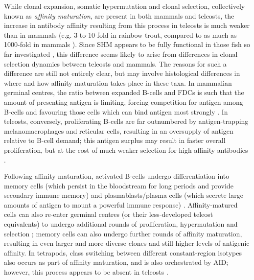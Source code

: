 While clonal expansion, somatic hypermutation and clonal selection, collectively known as \textit{affinity maturation}, are present in both mammals and teleosts, the increase in antibody affinity resulting from this process in teleosts is much weaker than in mammals (e.g. 3-to-10-fold in rainbow trout, compared to as much as 1000-fold in mammals \parencite{magor2015affinity}). Since SHM appears to be fully functional in those fish so far investigated \parencite{magor2015affinity}, this difference seems likely to arise from differences in clonal selection dynamics between teleosts and mammals. The reasons for such a difference are still not entirely clear, but may involve histological differences in where and how affinity maturation takes place in these taxa. In mammalian germinal centres, the ratio between expanded B-cells and FDCs is such that the amount of presenting antigen is limiting, forcing competition for antigen among B-cells and favouring those cells which can bind antigen most strongly \parencite{magor2015affinity}. In teleosts, conversely, proliferating B-cells are far outnumbered by antigen-trapping melanomacrophages and reticular cells, resulting in an oversupply of antigen relative to B-cell demand; this antigen surplus may result in faster overall proliferation, but at the cost of much weaker selection for high-affinity antibodies \parencite{magor2015affinity}.

Following affinity maturation, activated B-cells undergo differentiation into memory cells (which persist in the bloodstream for long periods and provide secondary immune memory) \parencite{victora2012gc,mayer2018memory} and plasmablasts/plasma cells (which secrete large amounts of antigen to mount a powerful immune response) \parencite{howard2006quality,dunnwalters2010bcellageing,victora2012gc}. Affinity-matured cells can also re-enter germinal centres (or their less-developed teleost equivalents) to undergo additional rounds of proliferation, hypermutation and selection \parencite{howard2006quality,victora2012gc}; memory cells can also undergo further rounds of affinity maturation, resulting in even larger and more diverse clones and still-higher levels of antigenic affinity. In tetrapods, class switching between different constant-region isotypes also occurs as part of affinity maturation, and is also orchestrated by AID; however, this process appears to be absent in teleosts \parencite{magor2015affinity}.

